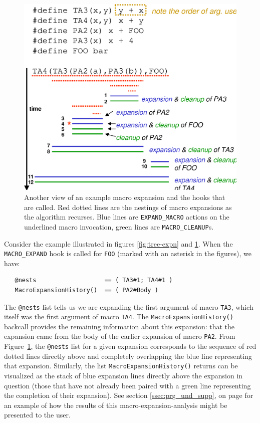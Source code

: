 \documentclass{article}
\newcommand{\sectionref}[1]{section \ref{#1}, on page \pageref{#1}}
\newcommand{\figref}[1]{Figure~\ref{#1}}
\begin{document}
\begin{figure}[p]
  \begin{center}
    \leavevmode
    \includegraphics[width=0.45\linewidth]{text-expn.eps}
    \caption{Another view of an example macro expansion and the hooks
    that are called.  Red dotted lines are the nestings of macro
    expansions as the algorithm recurses.  Blue lines are
    \texttt{EXPAND\_MACRO} actions on the underlined macro invocation,
    green lines are \texttt{MACRO\_CLEANUP}s.}
    \label{fig:text-expn}
  \end{center}
\end{figure}

Consider the example illustrated in figures \ref{fig:tree-expn} and
\ref{fig:text-expn}.  When the \texttt{MACRO\_EXPAND} hook is called for
\texttt{FOO} (marked with an asterisk in the figures), we have:

\begin{verbatim}
   @nests                   == ( TA3#1; TA4#1 )
   MacroExpansionHistory()  == ( PA2#Body )
\end{verbatim}

\noindent The \texttt{@nests} list tells us we are expanding the first
argument of macro \texttt{TA3}, which itself was the first argument of
macro \texttt{TA4}.  The \texttt{MacroExpansionHistory()} backcall
provides the remaining information about this expansion: that the
expansion came from the body of the earlier expansion of macro
\texttt{PA2}.  From \figref{fig:text-expn}, the \texttt{@nests} list
for a given expansion corresponds to the sequence of red dotted lines
directly above and completely overlapping the blue line representing
that expansion.  Similarly, the list \texttt{MacroExpansionHistory()}
returns can be visualized as the stack of blue expansion
lines directly above the expansion in question (those that have not
already been paired with a green line representing the completion of
their expansion).  See \sectionref{ssec:prg_und_supp} for an example of
how the results of this macro-expansion-analysis might be presented to
the user.
\end{document}
